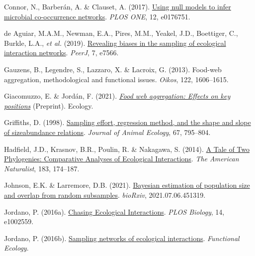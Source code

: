 \documentclass[10pt,oneside]{article}
\newlength{\cslhangindent}
\newenvironment{CSLReferences}[3] %
 {%
  \setlength{\parindent}{0pt}
  \ifodd #1 \everypar{\setlength{\hangindent}{\cslhangindent}}\ignorespaces\fi
  \ifnum #2 > 0
  \setlength{\parskip}{#2\baselineskip}
  \fi
 }%
 {}
\begin{document}
\begin{CSLReferences}{1}{0}
\leavevmode{}%
Connor, N., Barberán, A. \& Clauset, A. (2017).
\href{https://doi.org/10.1371/journal.pone.0176751}{Using null models to
infer microbial co-occurrence networks}. \emph{PLOS ONE}, 12, e0176751.

\leavevmode{}%
de Aguiar, M.A.M., Newman, E.A., Pires, M.M., Yeakel, J.D., Boettiger,
C., Burkle, L.A., \emph{et al.} (2019).
\href{https://doi.org/10.7717/peerj.7566}{Revealing biases in the
sampling of ecological interaction networks}. \emph{PeerJ}, 7, e7566.

\leavevmode{}%
Gauzens, B., Legendre, S., Lazzaro, X. \& Lacroix, G. (2013). Food-web
aggregation, methodological and functional issues. \emph{Oikos}, 122,
1606--1615.

\leavevmode{}%
Giacomuzzo, E. \& Jordán, F. (2021).
\emph{\href{https://doi.org/10.1101/2021.04.18.440319}{Food web
aggregation: Effects on key positions}} (Preprint). Ecology.

\leavevmode{}%
Griffiths, D. (1998).
\href{https://doi.org/10.1046/j.1365-2656.1998.00244.x}{Sampling effort,
regression method, and the shape and slope of sizeabundance relations}.
\emph{Journal of Animal Ecology}, 67, 795--804.

\leavevmode{}%
Hadfield, J.D., Krasnov, B.R., Poulin, R. \& Nakagawa, S. (2014).
\href{https://doi.org/10.1086/674445}{A Tale of Two Phylogenies:
Comparative Analyses of Ecological Interactions}. \emph{The American
Naturalist}, 183, 174--187.

\leavevmode{}%
Johnson, E.K. \& Larremore, D.B. (2021).
\href{https://doi.org/10.1101/2021.07.06.451319}{Bayesian estimation of
population size and overlap from random subsamples}. \emph{bioRxiv},
2021.07.06.451319.

\leavevmode{}%
Jordano, P. (2016a).
\href{https://doi.org/10.1371/journal.pbio.1002559}{Chasing Ecological
Interactions}. \emph{PLOS Biology}, 14, e1002559.

\leavevmode{}%
Jordano, P. (2016b).
\href{https://doi.org/10.1111/1365-2435.12763}{Sampling networks of
ecological interactions}. \emph{Functional Ecology}.


\end{CSLReferences}
\end{document}
